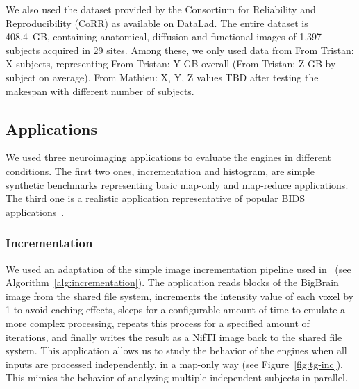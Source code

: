 \documentclass[conference]{IEEEtran}
\newcommand{\TG}[1]{\color{cyan}From Tristan: #1 \color{black}}
\newcommand{\MD}[1]{\color{magenta}From Mathieu: #1 \color{black}}
\begin{document}
We also used the dataset provided by the Consortium for Reliability and
Reproducibility
(\href{http://fcon_1000.projects.nitrc.org/indi/CoRR/html/}{CoRR}) as
available on
\href{http://datasets.datalad.org/?dir=/corr/RawDataBIDS}{DataLad}. The
entire dataset is 408.4~GB, containing anatomical, diffusion and functional
images of 1,397 subjects acquired in 29 sites. Among these, we only used
data from \TG{X} subjects, representing \TG{Y}GB overall (\TG{Z}GB by
subject on average).
\MD{X, Y, Z values TBD after testing the makespan with different number of subjects.}


\subsection{Applications}

We used three neuroimaging applications to evaluate the engines in different
conditions. The first two ones, incrementation and histogram, are simple synthetic
benchmarks representing basic map-only and map-reduce applications. The third one is
a realistic application representative of popular BIDS
applications~\cite{gorgolewski2017bids}. 

\subsubsection{Incrementation}
We used an adaptation of the simple image incrementation pipeline used
in~\cite{hayot2019performance} (see Algorithm~\ref{alg:incrementation}).
The application reads blocks of the BigBrain image from the shared file
system, increments the intensity value of each voxel by 1 to avoid caching
effects, sleeps for a configurable amount of time to emulate a more complex
processing, repeats this process for a specified amount of iterations, and
finally writes the result as a NifTI image back to the shared file system.
This application allows us to study the behavior of the engines when all
inputs are processed independently, in a map-only way (see
Figure~\ref{fig:tg-inc}). This mimics the behavior of analyzing multiple
independent subjects in parallel.

\begin{algorithm}[!b]
    \caption{Incrementation (adapted from~\cite{hayot2019performance})}\label{alg:incrementation}
    \begin{algorithmic}
        \EndFor
    \EndFor
\end{algorithmic}
\end{algorithm}
\end{document}
